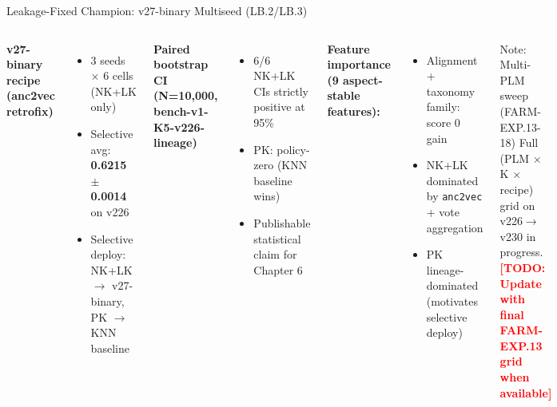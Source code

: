 \documentclass[12pt, aspectratio=169]{beamer}
\newcommand{\highlight}[1]{\textcolor{proteagreen}{\textbf{#1}}}
\newcommand{\todo}[1]{\textcolor{red}{\textbf{[TODO: #1]}}}
\begin{document}
\begin{frame}{Leakage-Fixed Champion: v27-binary Multiseed (LB.2/LB.3)}
  \begin{columns}[c]
      \textbf{v27-binary recipe (anc2vec retrofix)}
      \begin{itemize}
        \item 3 seeds $\times$ 6 cells (NK+LK only)
        \item Selective avg: \highlight{0.6215 $\pm$ 0.0014} on v226
        \item Selective deploy: NK+LK $\to$ v27-binary, PK $\to$ KNN baseline
      \end{itemize}
      \vspace{0.5em}
      \textbf{Paired bootstrap CI (N=10,000, bench-v1-K5-v226-lineage)}
      \begin{itemize}
        \item 6/6 NK+LK CIs strictly positive at 95\%
        \item PK: policy-zero (KNN baseline wins)
        \item Publishable statistical claim for Chapter 6
      \end{itemize}
      \textbf{Feature importance (9 aspect-stable features):}
      \begin{itemize}
        \item Alignment + taxonomy family: score 0 gain
        \item NK+LK dominated by \texttt{anc2vec} + vote aggregation
        \item PK lineage-dominated (motivates selective deploy)
      \end{itemize}
      \vspace{0.3em}
      \begin{block}{Note: Multi-PLM sweep (FARM-EXP.13-18)}
        Full (PLM $\times$ K $\times$ recipe) grid on v226$\to$v230 in progress.
        \todo{Update with final FARM-EXP.13 grid when available}
      \end{block}
  \end{columns}
\end{frame}
\end{document}
